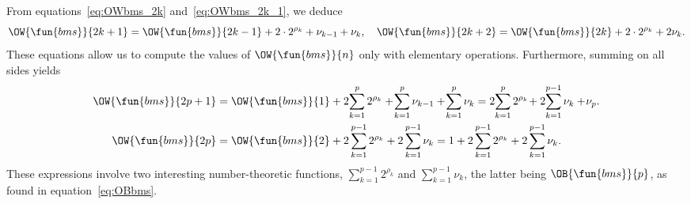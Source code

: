 From equations~\eqref{eq:OWbms_2k} and~\eqref{eq:OWbms_2k_1}, we deduce
\begin{equation*}
\OW{\fun{bms}}{2k+1} = \OW{\fun{bms}}{2k-1} + 2 \cdot 2^{\rho_k} +
\nu_{k-1} + \nu_k,\quad \OW{\fun{bms}}{2k+2} = \OW{\fun{bms}}{2k} + 2
\cdot 2^{\rho_k} + 2\nu_k.
\end{equation*}
These equations allow us to compute the values of
\(\OW{\fun{bms}}{n}\) only with elementary operations. Furthermore,
summing on all sides yields
\begin{align}
\OW{\fun{bms}}{2p+1}
 &= \OW{\fun{bms}}{1} + 2\!\sum_{k=1}^{p} 2^{\rho_k} +
    \!\sum_{k=1}^{p}\nu_{k-1} + \!\sum_{k=1}^p\nu_k
  = 2 \!\sum_{k=1}^{p} 2^{\rho_k}\! + 2\!\sum_{k=1}^{p-1}\nu_k +
    \!\nu_p.\label{eq:OWbms_2p_1}\\
\OW{\fun{bms}}{2p}
  &= \OW{\fun{bms}}{2} + 2\sum_{k=1}^{p-1}2^{\rho_k} +
2\sum_{k=1}^{p-1}\nu_k
  = 1 +  2\sum_{k=1}^{p-1}2^{\rho_k} + 2\sum_{k=1}^{p-1}\nu_k.
\label{eq:OWbms_2p}
\end{align}
These expressions involve two interesting number\hyp{}theoretic
functions, \(\sum_{k=1}^{p-1}2^{\rho_k}\) and
\(\sum_{k=1}^{p-1}\nu_k\), the latter being \(\OB{\fun{bms}}{p}\), as
found in equation~\eqref{eq:OBbms}.



